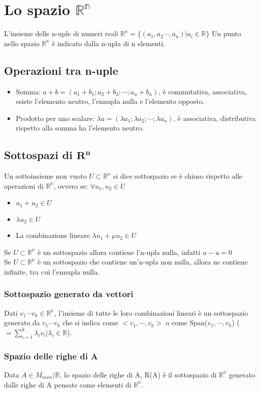 \chapter{Lo spazio $\mathbb{R^n}$}
L'insieme delle n-uple di numeri reali $\mathbb{R^n}=\{(a_1,a_2\cdots,a_n)|a_i\in\mathbb{R}\}$
Un punto nello spazio $\mathbb{R^n}$ \`e indicato dalla n-upla di n elementi.
\section{Operazioni tra n-uple}
\begin{itemize}
\item Somma: $a+b=(a_1+b_1; a_2+b_2;\cdots; a_n+b_n)$, \`e commutativa, associativa, esiste l'elemento neutro, l'ennupla nulla e l'elemento opposto.
\item Prodotto per uno scalare: $\lambda a=(\lambda a_1; \lambda a_2; \cdots; \lambda a_n)$, \`e associativa, distributiva rispetto alla somma ha l'elemento neutro.
\end{itemize}
\section{Sottospazi di $\mathbf{R^n}$}
Un sottoinsieme non vuoto $U\subset\mathbb{R^n}$ si dice sottospazio se \`e chiuso rispetto alle operazioni di $\mathbb{R^n}$, ovvero se: $\forall u_1, u_2\in U$
\begin{itemize}
\item $u_1+u_2\in U$
\item $\lambda u_2\in U$
\item La combinazione lineare $\lambda u_1+ \mu u_2\in U$
\end{itemize}
Se $U\subset\mathbb{R^n}$ \`e un sottospazio allora contiene l'n-upla nulla, infatti $u-u=0$\\
Se $U\subset\mathbb{R^n}$ \`e un sottospazio che contiene un'n-upla non nulla, allora ne contiene infinite, tra cui l'ennupla nulla.
\subsection{Sottospazio generato da vettori}
Dati $v_1\cdots v_k \in \mathbb{R^n}$, l'insieme di tutte le loro combinazioni lineari \`e un sottospazio generato da $v_1\cdots v_k$ che si indica come $<v_1,\cdots,v_k>$
o come Span($v_1,\cdots,v_k$) ($=\sum\limits_{i=1}^k \lambda_i v_i|\lambda_i\in\mathbb{R}$).
\subsection{Spazio delle righe di A}
Data $A\in M_{mxn}(\mathbb{R}$, lo spazio delle righe di A, R(A) \`e il sottospazio di $\mathbb{R^n}$ generato dalle righe di A pensate come elementi di $\mathbb{R^n}$.
